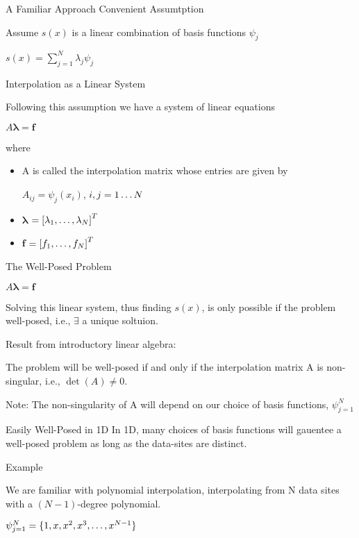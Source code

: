\documentclass[12pt,t]{beamer}
\newcommand{\bi}{\begin{itemize}}
\newcommand{\ei}{\end{itemize}}
\newcommand{\subt}[1]{{\footnotesize \color{subtitle} {#1}}}
\begin{document}
\begin{frame}{A Familiar Approach}
\subt{Convenient Assumtption}

Assume $s(x)$ is a linear combination of \subt{basis functions} $\psi_j$
\begin{center}
$s(x)=\sum_{j=1}^N \lambda_j \psi_j$
\end{center}

\subt{Interpolation as a Linear System}

Following this assumption we have a system of linear equations
\begin{center}
$A\boldsymbol{\lambda}=\boldsymbol{f}$
\end{center}
 where
 \bi
\item[A] is called the \subt{interpolation matrix} whose entries are given by\\
\begin{center}
$A_{ij}=\psi_j(x_i)$, $i,j= 1 \mathellipsis N$
\end{center}
\item[$\boldsymbol{\lambda}$] $=\left[ \lambda_1, \mathellipsis, \lambda_N \right]^T$
\item[$\boldsymbol{f}$] $=\left[ f_1, \mathellipsis, f_N \right]^T$
\ei

\note{}
\end{frame}

\begin{frame}{The Well-Posed Problem}
\begin{center}
$A\boldsymbol{\lambda}=\boldsymbol{f}$
\end{center}

Solving this linear system, thus finding $s(x)$, is only possible if the problem \subt{well-posed}, i.e., $\exists$ a unique soltuion. 
\bigskip

\subt{Result from introductory linear algebra:} 

The problem will be well-posed if and only if the interpolation matrix A is \subt{non-singular}, i.e., $\det(A)\neq0$.
\bigskip

\subt{Note:} The non-singularity of A will depend on our choice of basis functions, $\psi_{j=1}^N$

\note{}
\end{frame}

\begin{frame}{Easily Well-Posed in 1D}
In 1D, many choices of basis functions will gauentee a well-posed problem as long as the data-sites are distinct. 
\bigskip

\subt{Example}

We are familiar with \subt{polynomial interpolation}, interpolating from N data sites with a $(N-1)$-degree polynomial. 
\begin{center}
$\psi_{j=1}^N=\{1,x,x^2,x^3, \mathellipsis, x^{N-1}\}$
\end{center}
\note{}
\end{frame}
\end{document}
